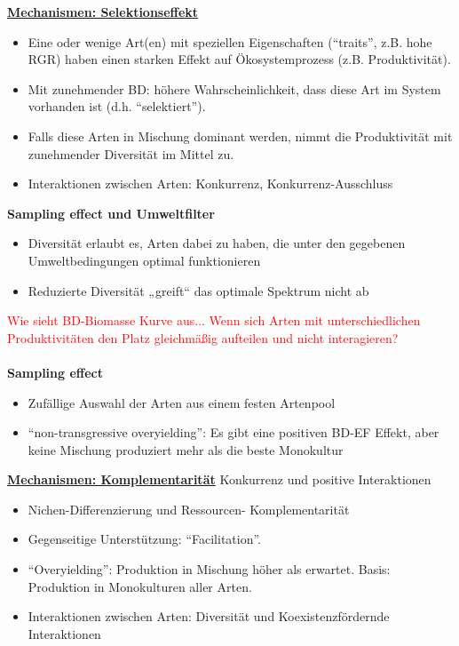 \underline{\textbf{Mechanismen: Selektionseffekt}}
\begin{itemize}
	\item Eine oder wenige Art(en) mit speziellen Eigenschaften (“traits”, z.B. hohe RGR) haben einen starken Effekt auf Ökosystemprozess (z.B. Produktivität).
	\item Mit zunehmender BD: höhere Wahrscheinlichkeit, dass diese Art im System vorhanden ist (d.h. “selektiert”).
	\item Falls diese Arten in Mischung dominant werden, nimmt die Produktivität mit zunehmender Diversität im Mittel zu.
	\item Interaktionen zwischen Arten: Konkurrenz, Konkurrenz-Ausschluss
\end{itemize}

\textbf{Sampling effect und Umweltfilter}
\begin{itemize}
	\item Diversität erlaubt es, Arten dabei zu haben, die unter den gegebenen Umweltbedingungen optimal funktionieren
	\item Reduzierte Diversität „greift“ das optimale Spektrum nicht ab
\end{itemize}

\textcolor{red}{Wie sieht BD-Biomasse Kurve aus... Wenn sich Arten mit unterschiedlichen Produktivitäten den Platz gleichmäßig aufteilen und nicht interagieren?}
\\\\
\textbf{Sampling effect}
\begin{itemize}
	\item Zufällige Auswahl der Arten aus einem festen Artenpool
	\item “non-transgressive overyielding”: Es gibt eine positiven BD-EF Effekt, aber keine Mischung produziert mehr als die beste Monokultur
\end{itemize}
	
\underline{\textbf{Mechanismen: Komplementarität}}
Konkurrenz und positive Interaktionen
\begin{itemize}
	\item Nichen-Differenzierung und Ressourcen- Komplementarität
	\item Gegenseitige Unterstützung: “Facilitation”.
	\item “Overyielding”: Produktion in Mischung höher als erwartet. Basis: Produktion in Monokulturen aller Arten.
	\item Interaktionen zwischen Arten: Diversität und Koexistenzfördernde Interaktionen
\end{itemize}

